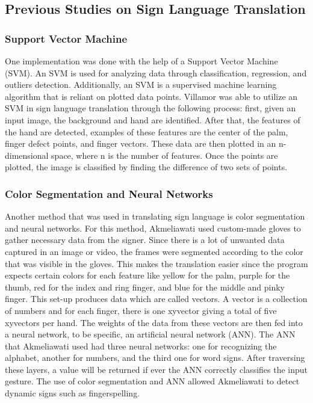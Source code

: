 \documentclass[journal]{./IEEE/IEEEtran}
\begin{document}
\subsection{Previous Studies on Sign Language Translation}

\subsubsection{Support Vector Machine}
One implementation was done with the help of a Support Vector Machine (SVM). An SVM is used for analyzing data through classification, regression, and outliers detection. Additionally, an SVM is a supervised machine learning algorithm that is reliant on plotted data points. Villamor \cite{Villamor2018} was able to utilize an SVM in sign language translation through the following process: first, given an input image, the background and hand are identified. After that, the features of the hand are detected, examples of these features are the center of the palm, finger defect points, and finger vectors. These data are then plotted in an n-dimensional space, where n is the number of features. Once the points are plotted, the image is classified by finding the difference of two sets of points.
\newline
\subsubsection{Color Segmentation and Neural Networks} 
Another method that was used in translating sign language is color segmentation and neural networks. For this method, Akmeliawati \cite{Akmeliawati2007} used custom-made gloves to gather necessary data from the signer. Since there is a lot of unwanted data captured in an image or video, the frames were segmented according to the color that was visible in the gloves. This makes the translation easier since the program expects certain colors for each feature like yellow for the palm, purple for the thumb, red for the index and ring finger, and blue for the middle and pinky finger.
\newline
\indent This set-up produces data which are called vectors. A vector is a collection of numbers and for each finger, there is one xyvector giving a total of five xyvectors per hand. The weights of the data from these vectors are then fed into a neural network, to be specific, an artificial neural network (ANN). The ANN that Akmeliawati used had three neural networks: one for recognizing the alphabet, another for numbers, and the third one for word signs. After traversing these layers, a value will be returned if ever the ANN correctly classifies the input gesture. The use of color segmentation and ANN allowed Akmeliawati to detect dynamic signs such as fingerspelling.
\newline
\end{document}
